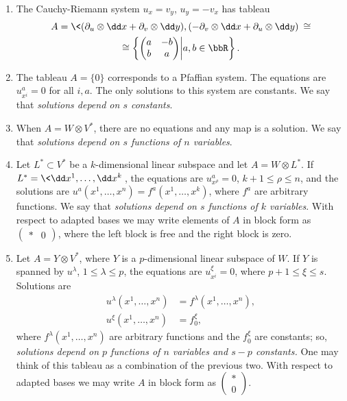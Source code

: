 \begin{example}\label{ex tableau}
    \begin{enumerate}
        \item The Cauchy-Riemann system $u_{x}=v_{y}$, $u_{y}=-v_{x}$ has tableau 
        \begin{multline}
            A=\<(\partial_{u}\otimes\dd x+\partial_{v}\otimes\dd y),(-\partial_{v}\otimes \dd x+\partial_{u}\otimes\dd y)\>\cong\\
            \cong \left\{
                \begin{pmatrix}
                    a& -b\\b&a
                \end{pmatrix}\middle|a,b\in\bbR
            \right\}.
        \end{multline}
        \item  The tableau $A=\{0\}$ corresponds to a Pfaffian system. The equations are $u^a_{x^i}=0$ for all $i,a$. The only solutions to this system are constants. We say that \emph{solutions depend on $s$ constants}.
        \item When $A=W\otimes V^\ast$, there are no equations and any map is a solution. We say that \emph{solutions depend on $s$ functions of $n$ variables}.
        \item Let $L^\ast\subset V^\ast$ be a $k$-dimensional linear subspace and let $A=W\otimes L^\ast$. If $L^\ast=\<\dd x^1,\ldots,\dd x^k\>$, the equations are $u^a_{x^\rho}=0$, $k+1\leq \rho\leq n$, and the solutions are $u^a(x^1,\ldots,x^n)=f^a(x^1,\ldots,x^k)$, where $f^a$ are arbitrary functions. We say that \emph{solutions depend on $s$ functions of $k$ variables}. With respect to adapted bases we may write elements of $A$ in block form as $\left(\begin{smallmatrix}
            *&0
        \end{smallmatrix}\right)$, where the left block is free and the right block is zero.
        \item Let $A=Y\otimes V^\ast$, where $Y$ is a $p$-dimensional linear subspace of $W$. If $Y$ is spanned by $u^\lambda$, $1\leq \lambda\leq p$, the equations are $u^\xi_{x^i}=0$, where $p+1\leq \xi\leq s$. Solutions are 
        \begin{align}
            u^\lambda(x^1,\ldots,x^n)&=f^\lambda(x^1,\ldots,x^n),\\
            u^\xi(x^1,\ldots,x^n)&=f^\xi_0,
        \end{align}
        where $f^\lambda(x^1,\ldots,x^n)$ are arbitrary functions and the $f_0^\xi$ are constants; so, \emph{solutions depend on $p$ functions of $n$ variables and $s-p$ constants.} One may think of this tableau as a combination of the previous two. With respect to adapted bases we may write $A$ in block form as $\left(\begin{smallmatrix}
            *\\0
        \end{smallmatrix}\right)$.
    \end{enumerate}
\end{example}


